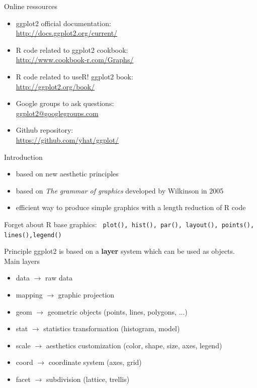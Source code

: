 \documentclass{beamer}\usepackage[]{graphicx}\usepackage[]{color}
\begin{document}
\begin{frame}{Online ressources}
    	\begin{itemize}
    	  \item ggplot2 official documentation:\\  \url{http://docs.ggplot2.org/current/}
        \item R code related to ggplot2 cookbook:\\ \url{http://www.cookbook-r.com/Graphs/}
        \item R code related to useR! ggplot2 book:\\ \url{http://ggplot2.org/book/}
  		  \item Google groups to ask questions:\\ \url{ggplot2@googlegroups.com}
        \item Github repository:\\ \url{https://github.com/yhat/ggplot/}
			\end{itemize}
\end{frame}


\begin{frame}{Introduction}
  \begin{itemize}
    \item based on new aesthetic principles
    \item based on \textit{The grammar of graphics} developed by Wilkinson in 2005
    \item efficient way to produce simple graphics with a length reduction of R code
  \end{itemize}
  
  \begin{alertblock}{Forget about R base graphics:}
     \texttt{ plot(), hist(), par(), layout(), points(), lines(),legend()}
  \end{alertblock}
\end{frame}

\begin{frame}{Principle}
ggplot2 is based on a \textbf{layer} system which can be used as objects.\\
\vspace{1cm}
Main layers
  \begin{itemize}
    \item data $\rightarrow$ raw data
    \item mapping $\rightarrow$ graphic projection
    \item geom $\rightarrow$ geometric objects (points, lines, polygons, ...)
    \item stat $\rightarrow$ statistics transformation (histogram, model)
    \item scale $\rightarrow$ aesthetics customization (color, shape, size, axes, legend)
    \item coord $\rightarrow$ coordinate system (axes, grid)
    \item facet $\rightarrow$ subdivision (lattice, trellis)
  \end{itemize}
\end{frame}
\end{document}
